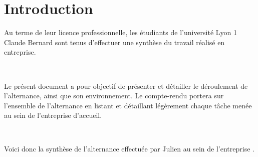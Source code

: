 \chapter*{Introduction}
Au terme de leur licence professionnelle, les étudiants de l'université Lyon 1 Claude Bernard sont tenus d'effectuer une synthèse du travail réalisé en entreprise.

~

Le présent document a pour objectif de présenter et détailler le déroulement de l'alternance, ainsi que son environnement. Le compte-rendu portera sur l'ensemble de l'alternance en listant et détaillant légèrement chaque tâche menée au sein de l'entreprise d'accueil.

~

Voici donc la synthèse de l'alternance effectuée par Julien  au sein de l'entreprise \solulog{}.